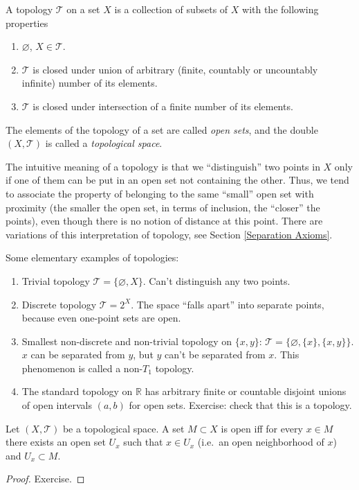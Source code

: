 \begin{defn}[Topology]
A topology $\mathcal{{T}}$ on a set $X$ is a collection of subsets
of $X$ with the following properties
\begin{enumerate}
\item $\varnothing$, $X\in\mathcal{{T}}$.
\item $\mathcal{{T}}$ is closed under union of arbitrary (finite, countably
or uncountably infinite) number of its elements.
\item $\mathcal{{T}}$ is closed under intersection of a finite number of
its elements.
\end{enumerate}
The elements of the topology of a set are called \emph{open sets},
and the double $(X,\mathcal{{T}})$ is called a \emph{topological
space}.
\end{defn}

The intuitive meaning of a topology is that we ``distinguish'' two points in $X$ only if one of them can be put in an open set not containing the other. Thus, we tend to associate the property of belonging to the same ``small'' open set with proximity (the smaller the open set, in terms of inclusion, the ``closer'' the points), even though there is no notion of distance at this point. There are variations of this interpretation of topology, see Section \ref{Separation Axioms}.

\begin{example} Some elementary examples of topologies:
\begin{enumerate}
    \item Trivial topology $\mathcal T=\{\varnothing,X\}$. Can't distinguish any two points.
    \item Discrete topology $\mathcal T=2^X$. The space ``falls apart'' into separate points, because even one-point sets are open.
    \item Smallest non-discrete and non-trivial topology on $\{x,y\}$: $\mathcal{T}=\{\varnothing,\{x\},\{x,y\}\}$. $x$ can be separated from $y$, but $y$ can't be separated from $x$. This phenomenon is called a non-$T_1$ topology.
    \item The standard topology on $\mathbb R$ has arbitrary finite or countable disjoint unions of open intervals $(a,b)$ for open sets. Exercise: check that this is a topology.
\end{enumerate}
\end{example}
\begin{prop}\label{open iff contains neighborhoods}
Let $(X,\mathcal{T})$ be a topological space. A set $M\subset X$ is open iff for every $x\in M$ there exists an open set $U_x$ such that $x\in U_x$ (i.e.\ an open neighborhood of $x$) and $U_x\subset M$.
\end{prop}
\begin{proof}
Exercise.
\end{proof}

